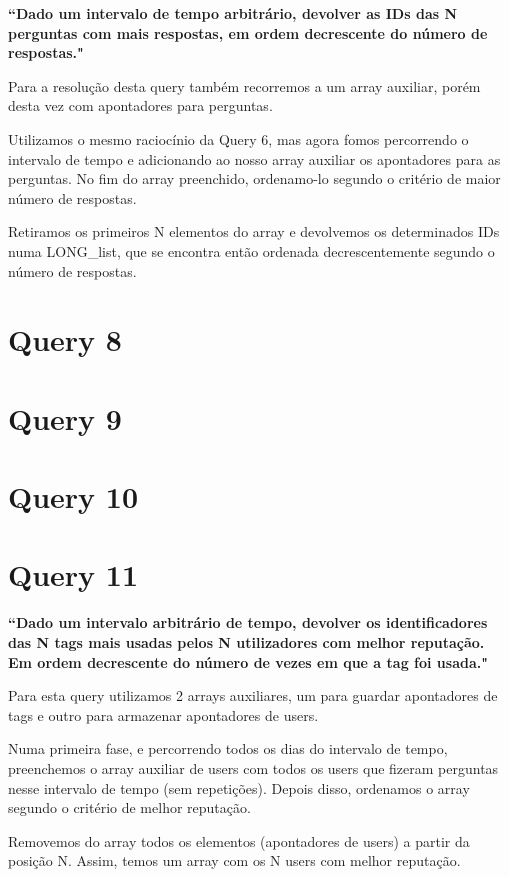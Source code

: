 \documentclass[a4paper]{report}
\begin{document}
\textbf{“Dado um intervalo de tempo arbitrário, devolver as IDs das N perguntas
com mais respostas, em ordem decrescente do número de respostas."}

Para a resolução desta query também recorremos a um array auxiliar, porém
desta vez com apontadores para perguntas.

Utilizamos o mesmo raciocínio da Query 6, mas agora fomos percorrendo o intervalo
de tempo e adicionando ao nosso array auxiliar os apontadores para as perguntas.
No fim do array preenchido, ordenamo-lo segundo o critério de maior número de respostas.

Retiramos os primeiros N elementos do array e devolvemos os determinados IDs
numa LONG\_list, que se encontra então ordenada decrescentemente segundo o número de respostas.


\section{Query 8}
\label{sec:query8}

\section{Query 9}
\label{sec:query9}

\section{Query 10}
\label{sec:query10}

\section{Query 11}
\label{sec:query11}

\textbf{“Dado um intervalo arbitrário de tempo, devolver os identificadores das N tags
mais usadas pelos N utilizadores com melhor reputação. Em ordem decrescente do número
de vezes em que a tag foi usada."}

Para esta query utilizamos 2 arrays auxiliares, um para guardar apontadores de tags
e outro para armazenar apontadores de users.

Numa primeira fase, e percorrendo todos os dias do intervalo de tempo,
preenchemos o array auxiliar de users com todos os users que fizeram perguntas
nesse intervalo de tempo (sem repetições). Depois disso, ordenamos o array segundo
o critério de melhor reputação.

Removemos do array todos os elementos (apontadores de users) a partir da posição N.
Assim, temos um array com os N users com melhor reputação.
\end{document}
